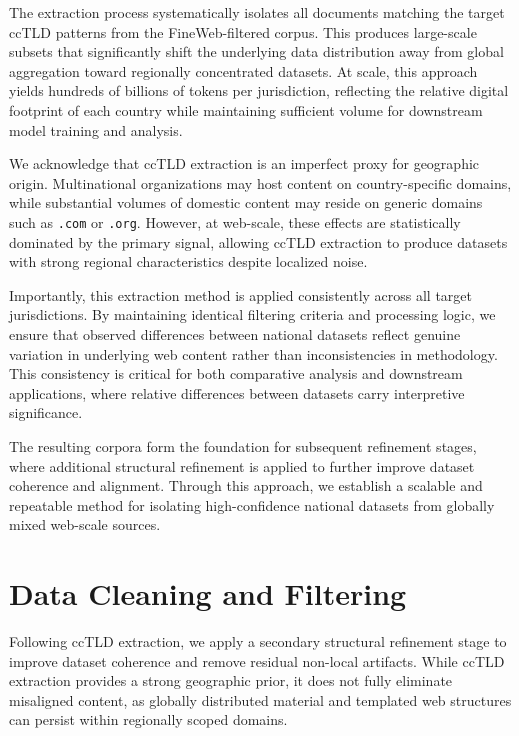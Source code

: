 \documentclass[11pt, a4paper]{article}
\begin{document}
The extraction process systematically isolates all documents matching the target ccTLD patterns from the FineWeb-filtered corpus. This produces large-scale subsets that significantly shift the underlying data distribution away from global aggregation toward regionally concentrated datasets. At scale, this approach yields hundreds of billions of tokens per jurisdiction, reflecting the relative digital footprint of each country while maintaining sufficient volume for downstream model training and analysis.

We acknowledge that ccTLD extraction is an imperfect proxy for geographic origin. Multinational organizations may host content on country-specific domains, while substantial volumes of domestic content may reside on generic domains such as \texttt{.com} or \texttt{.org}. However, at web-scale, these effects are statistically dominated by the primary signal, allowing ccTLD extraction to produce datasets with strong regional characteristics despite localized noise.

Importantly, this extraction method is applied consistently across all target jurisdictions. By maintaining identical filtering criteria and processing logic, we ensure that observed differences between national datasets reflect genuine variation in underlying web content rather than inconsistencies in methodology. This consistency is critical for both comparative analysis and downstream applications, where relative differences between datasets carry interpretive significance.

The resulting corpora form the foundation for subsequent refinement stages, where additional structural refinement is applied to further improve dataset coherence and alignment. Through this approach, we establish a scalable and repeatable method for isolating high-confidence national datasets from globally mixed web-scale sources.

\section{Data Cleaning and Filtering}

Following ccTLD extraction, we apply a secondary structural refinement stage to improve dataset coherence and remove residual non-local artifacts. While ccTLD extraction provides a strong geographic prior, it does not fully eliminate misaligned content, as globally distributed material and templated web structures can persist within regionally scoped domains.
\end{document}
